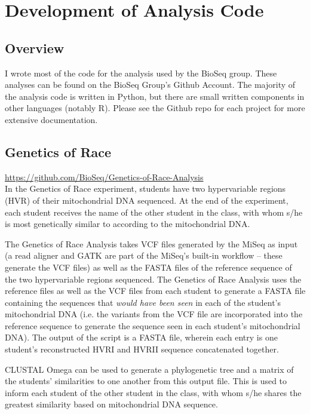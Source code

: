 \documentclass{report}
\begin{document}
\chapter{Development of Analysis Code}
\section{Overview}
I wrote most of the code for the analysis used by the BioSeq group. These analyses can be found on the BioSeq Group's Github Account. The majority of the analysis code is written in Python, but there are small written components in other languages (notably R). Please see the Github repo for each project for more extensive documentation.

\section{Genetics of Race}
\url{https://github.com/BioSeq/Genetics-of-Race-Analysis} \\

\noindent In the Genetics of Race experiment, students have two hypervariable regions (HVR) of their mitochondrial DNA sequenced. At the end of the experiment, each student receives the name of the other student in the class, with whom s/he is most genetically similar to according to the mitochondrial DNA. 

The Genetics of Race Analysis takes VCF files generated by the MiSeq as input (a read aligner and GATK are part of the MiSeq's built-in workflow -- these generate the VCF files) as well as the FASTA files of the reference sequence of the two hypervariable regions sequenced. The Genetics of Race Analysis uses the reference files as well as the VCF files from each student to generate a FASTA file containing the sequences that \emph{would have been seen} in each of the student's mitochondrial DNA (i.e. the variants from the VCF file are incorporated into the reference sequence to generate the sequence seen in each student's mitochondrial DNA). The output of the script is a FASTA file, wherein each entry is one student's reconstructed HVRI and HVRII sequence concatenated together.

CLUSTAL Omega can be used to generate a phylogenetic tree and a matrix of the students' similarities to one another from this output file. This is used to inform each student of the other student in the class, with whom s/he shares the greatest similarity based on mitochondrial DNA sequence.
\end{document}
